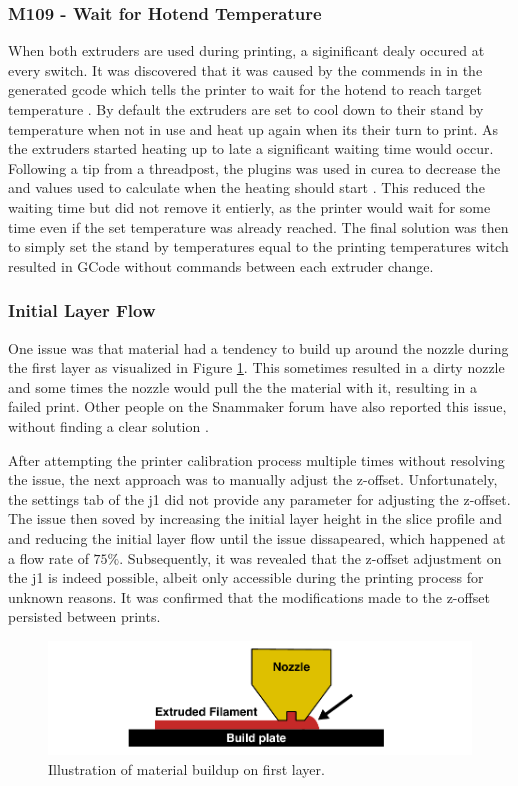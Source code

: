 \subsubsection{M109 - Wait for Hotend Temperature}
When both extruders are used during printing, a siginificant dealy occured at every switch.
It was discovered that it was caused by the  commends in in the generated \gls{gcode} which tells the printer to wait for the hotend to reach target temperature \cite{thinkyheadWaitHotendTemperature2023}.
By default the extruders are set to cool down to their stand by temperature when not in use and heat up again when its their turn to print.
As the extruders started heating up to late a significant waiting time would occur.
Following a tip from a threadpost, the  plugins was used in curea to decrease the  and  values used to calculate when the heating should start \cite{valiantReplyStandbyTemperature2022} \cite{fieldofviewPrinterSettingsUltimaker}.
This reduced the waiting time but did not remove it entierly, as the printer would wait for some time even if the set temperature was already reached.
The final solution was then to simply set the stand by temperatures equal to the printing temperatures witch resulted in GCode without  commands between each extruder change.


\subsubsection{Initial Layer Flow}
One issue was that material had a tendency to build up around the nozzle during the first layer as visualized in Figure \ref{fig:first_layer_buildup}.
This sometimes resulted in a dirty nozzle and some times the nozzle would pull the the material with it, resulting in a failed print.
Other people on the Snammaker forum have also reported this issue, without finding a clear solution \cite{artezioFinerAdjustmentsOffset2021} \cite{napsZHeightCalibrationOffset2023}.

After attempting the printer calibration process multiple times without resolving the issue, the next approach was to manually adjust the z-offset.
Unfortunately, the settings tab of the \gls{j1} did not provide any parameter for adjusting the z-offset.
The issue then soved by increasing the initial layer height in the slice profile and and reducing the initial layer flow until the issue dissapeared, which happened at a flow rate of $75\%$.
Subsequently, it was revealed that the z-offset adjustment on the \gls{j1} is indeed possible, albeit only accessible during the printing process for unknown reasons.
It was confirmed that the modifications made to the z-offset persisted between prints.

\begin{figure}[H]
    \centering
    \includegraphics[width=\textwidth]{figures/3d_print/first_layer_buildup.pdf}
    \caption{Illustration of material buildup on first layer.}
    \label{fig:first_layer_buildup}
\end{figure}